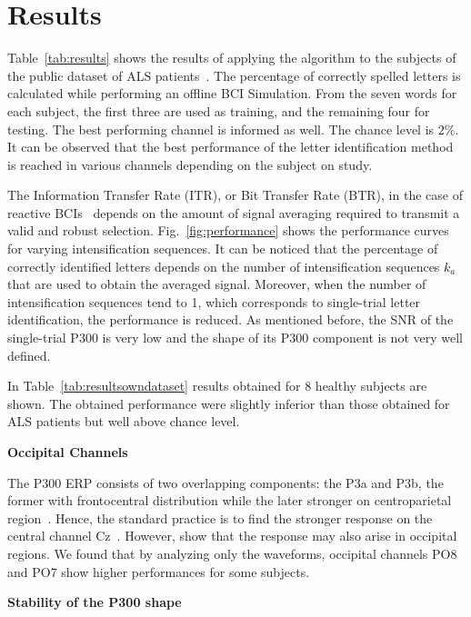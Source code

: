 \documentclass[utf8]{frontiersSCNS} %
\begin{document}
\section{Results} \label{Results}
\label{section:results}

Table~\ref{tab:results} shows the results of applying the algorithm to the subjects of the public dataset of ALS patients~\citep{Riccio2013}. The percentage of correctly spelled letters is calculated while performing an offline BCI Simulation.  From the seven words for each subject, the first three are used as training, and the remaining four for testing.  The best performing channel is informed as well. The chance level is $2\%$.  It can be observed that the best performance of the letter identification method is reached in various channels depending on the subject on study. 

The Information Transfer Rate (ITR), or Bit Transfer Rate (BTR), in the case of reactive BCIs~\citep{WolpawJonathanR2012}  depends on the amount of signal averaging required to transmit a valid and robust selection.  Fig.~\ref{fig:performance} shows the performance curves for varying intensification sequences. It can be noticed that the percentage of correctly identified letters depends on the number of intensification sequences $k_a$ that are used to obtain the averaged signal.  Moreover, when the number of intensification sequences tend to 1, which corresponds to single-trial letter identification, the performance is reduced. As mentioned before, the SNR of the single-trial P300 is very low and the shape of its P300 component is not very well defined.

In Table~\ref{tab:resultsowndataset} results obtained for 8 healthy subjects are shown.  The obtained performance were slightly inferior than those obtained for ALS patients but well above chance level.

\textbf{Occipital Channels}

The P300 ERP  consists of two overlapping components: the P3a and P3b, the former with frontocentral distribution while the later stronger on centroparietal region~\citep{Polich2007}. Hence, the standard practice is to find the stronger response on the central channel Cz~\citep{Riccio2013}. However, \cite{Krusienski2006} show that the response may also arise in occipital regions.  We found that by analyzing only the waveforms, occipital channels PO8 and PO7 show higher performances for some subjects. 

\textbf{Stability of the P300 shape}
\end{document}
